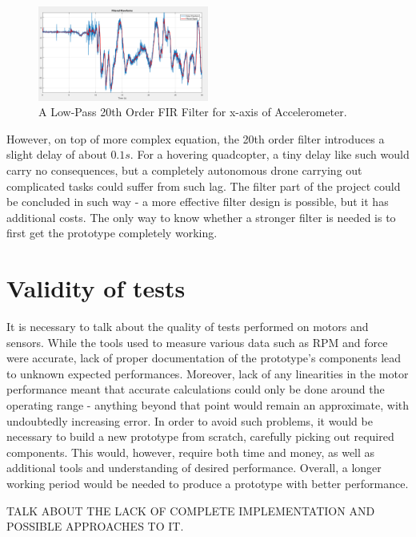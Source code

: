 \begin{figure}[H]
  \centering
    \includegraphics[width=0.5\textwidth]{images/newFilter.png}
	\caption{A Low-Pass 20th Order FIR Filter for x-axis of Accelerometer.}
	\label{newFilter}
\end{figure}

However, on top of more complex equation, the 20th order filter introduces a slight delay of about $0.1s$. For a hovering quadcopter, a tiny delay like such would carry no consequences, but a completely autonomous drone carrying out complicated tasks could suffer from such lag.
The filter part of the project could be concluded in such way - a more effective filter design is possible, but it has additional costs. The only way to know whether a stronger filter is needed is to first get the prototype completely working.

\section{Validity of tests}
It is necessary to talk about the quality of tests performed on motors and sensors. While the tools used to measure various data such as RPM and force were accurate, lack of proper documentation of the prototype's components lead to unknown expected performances. Moreover, lack of any linearities in the motor performance meant that accurate calculations could only be done around the operating range - anything beyond that point would remain an approximate, with undoubtedly increasing error.
In order to avoid such problems, it would be necessary to build a new prototype from scratch, carefully picking out required components. This would, however, require both time and money, as well as additional tools and understanding of desired performance. Overall, a longer working period would be needed to produce a prototype with better performance.

TALK ABOUT THE LACK OF COMPLETE IMPLEMENTATION AND POSSIBLE APPROACHES TO IT.